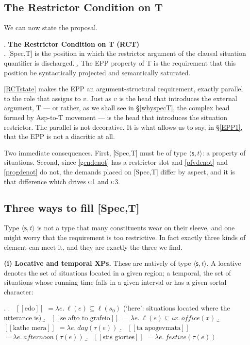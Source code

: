 \documentclass[11pt]{article}
\newcommand{\dbr}[1]{\mbox{ $ [\![ #1 ]\!] $}}
\newcommand{\sit}{\ensuremath{\mathsf{s}}\xspace}
\newcommand{\ty}[1]{\ensuremath{\langle #1 \rangle}}
\begin{document}
\subsection{The Restrictor Condition on T}\label{RCT}

We can now state the proposal.

\ex. \label{RCTstate}
\textbf{The Restrictor Condition on T (RCT)}\\
\a. [Spec,T] is the position in which the restrictor argument of the clausal situation quantifier is discharged.
\b. The EPP property of T is the requirement that this position be syntactically projected and semantically saturated.

\medskip
\ref{RCTstate} makes the EPP an argument-structural requirement, exactly parallel to the role that \citet{kratzer:96} assigns to $v$.  Just as $v$ is the head that introduces the external argument, T --- or rather, as we shall see in \S\ref{whyspecT}, the complex head formed by Asp-to-T movement --- is the head that introduces the situation restrictor.  The parallel is not decorative.  It is what allows us to say, in \S\ref{EPP1}, that the EPP is not a diacritic at all.

Two immediate consequences.  First, [Spec,T] must be of type \ty{\sit,t}: a property of situations.  Second, since \ref{gendenot} has a restrictor slot and \ref{pfvdenot} and \ref{progdenot} do not, the demands placed on [Spec,T] differ by aspect, and it is that difference which drives \textsc{g1} and \textsc{g3}.

\subsection{Three ways to fill [Spec,T]}\label{threeways}

Type \ty{\sit,t} is not a type that many constituents wear on their sleeve, and one might worry that the requirement is too restrictive.  In fact exactly three kinds of element can meet it, and they are exactly the three we find.

\medskip\noindent\textbf{(i) Locative and temporal XPs.}  These are natively of type \ty{\sit,t}.  A locative denotes the set of situations located in a given region; a temporal, the set of situations whose running time falls in a given interval or has a given sortal character:

\ex. \label{xpdenots}
\a. \dbr{\text{edo}} $= \lambda e.\ \ell(e) \subseteq \ell(s_{0})$ \hfill (`here': situations located where the utterance is)
\b. \dbr{\text{se afto to grafeio}} $= \lambda e.\ \ell(e) \subseteq \iota x.\ \mathit{office}(x)$
\b. \dbr{\text{kathe mera}} $= \lambda e.\ \mathit{day}(\tau(e))$
\b. \dbr{\text{ta apogevmata}} $= \lambda e.\ \mathit{afternoon}(\tau(e))$
\b. \dbr{\text{stis giortes}} $= \lambda e.\ \mathit{festive}(\tau(e))$
\end{document}
